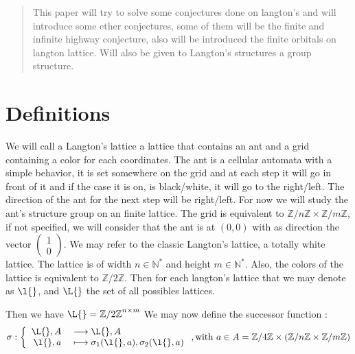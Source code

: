 \documentclass[a4paper,10pt]{article}
\title{}
\author{}
\begin{document}
\maketitle

\begin{abstract}

This paper will try to solve some conjectures done on langton's and will introduce some ether conjectures, some of them will be the finite and infinite highway conjecture, also will be introduced 
the finite orbitals on langton lattice. Will also be given to Langton's structures a group structure.

\end{abstract}

\section{Definitions}

We will call a Langton's lattice a lattice that contains an ant and a grid containing a color for each coordinates. The ant is a cellular automata with a simple behavior, it is set somewhere on the 
grid and at each step it will go in front of it and if the case it is on, is black/white, it will go to the right/left. The direction of the ant for the next step will be right/left.
For now we will study the ant's structure group on an finite lattice.
The grid is equivalent to $\mathbb{Z}/n\mathbb{Z} \times \mathbb{Z}/m\mathbb{Z}$, if not specified, we will consider that the ant is at $(0,0)$ with as direction the vector $\begin{pmatrix} 1 \\  0\end{pmatrix}$.
We may refer to the classic Langton's lattice, a totally white lattice. The lattice is of width $n \in \mathbb{N}^*$ and height $m \in \mathbb{N}^*$. 
\newline
Also, the colors of the lattice is equivalent to $\mathbb{Z} / 2\mathbb{Z}$. Then for each langton's lattice that we may denote as $\l{}$, and $\L{}$ the set of all possibles lattices.

Then we have $\L{} = {\mathbb{Z} / 2\mathbb{Z}}^{n\times m}$
We may now define the successor function :
\begin{equation}
\label{sigma}
 \sigma: 
	\left\{ \begin{array}{rl}
	 \L{},A &\ \longrightarrow \L{}, A\\
	 \l{},a &\ \longmapsto \sigma_1(\l{}, a), \sigma_2(\l{}, a)
	 \end{array} \right.
,\text{with } 	a \in A = {\mathbb{Z}/4\mathbb{Z}}  \times (\mathbb{Z}/n\mathbb{Z} \times \mathbb{Z}/m\mathbb{Z})
\end{equation}
\end{document}
